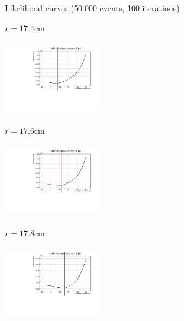 \documentclass[8 pt]{beamer}
\begin{document}
\begin{frame}{Likelihood curves (50.000 events, 100 iterations)}
\vspace{-5pt}
\begin{minipage}[c]{.32\textwidth}
\begin{exampleblock}{} \begin{center}$r = 17.4$cm\end{center} \end{exampleblock}
\includegraphics[width=4.2cm, height=3.2cm]{figs/likelihood100HighStat/likelihood17p4.pdf} 
\end{minipage}
\begin{minipage}[c]{.32\textwidth}
\begin{exampleblock}{} \begin{center}$r = 17.6$cm\end{center} \end{exampleblock}
\includegraphics[width=4.2cm, height=3.2cm]{figs/likelihood100HighStat/likelihood17p6.pdf} 
\end{minipage}
\begin{minipage}[c]{.32\textwidth}
\begin{exampleblock}{} \begin{center}$r = 17.8$cm\end{center} \end{exampleblock}
\includegraphics[width=4.2cm, height=3.2cm]{figs/likelihood100HighStat/likelihood17p8.pdf} 
\end{minipage}
\end{frame}
\end{document}
